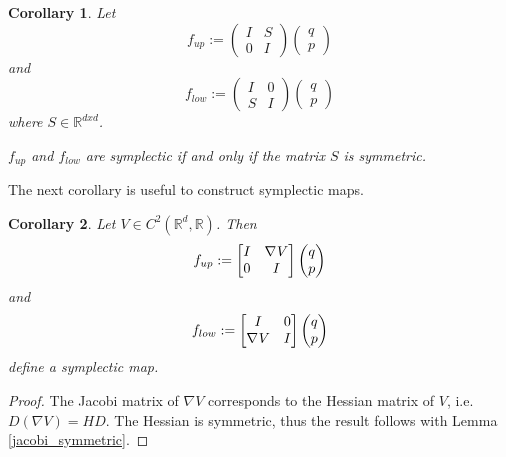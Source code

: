 \documentclass[twoside,a4paper]{article}
\newtheorem{corollary}{Corollary}
\begin{document}
\begin{corollary}\label{matrix_symmetric}
	Let
	\begin{equation*}
		f_{up} := \begin{pmatrix}
			I & S \\
			0 & I
		\end{pmatrix} \begin{pmatrix}
			q \\
			p
		\end{pmatrix}
	\end{equation*}
	and
	\begin{equation*}
		f_{low} := \begin{pmatrix}
			I & 0 \\
			S & I
		\end{pmatrix} \begin{pmatrix}
			q \\
			p
		\end{pmatrix}
	\end{equation*}
	where $S \in \mathbb{R}^{dxd}$. 

	$f_{up}$ and $f_{low}$ are symplectic if and only if the matrix $S$
	is symmetric.
\end{corollary}

The next corollary is useful to construct symplectic maps.
\begin{corollary}\label{gradient_corollary}
	Let $V \in C^2(\mathbb{R}^d, \mathbb{R})$. Then
	\begin{equation*}
		f_{up} := \begin{bmatrix}
			I & \nabla_{}{V} \\
			0 & I
		\end{bmatrix} \begin{pmatrix}
			q \\
			p
		\end{pmatrix}
	\end{equation*}
	and
	\begin{equation*}
		f_{low} := \begin{bmatrix}
			I & 0 \\
			\nabla_{}{V} & I
		\end{bmatrix} \begin{pmatrix}
			q \\
			p
		\end{pmatrix}
	\end{equation*}
	define a symplectic map.
\end{corollary}
\begin{proof}
	The Jacobi matrix of $\nabla V$ corresponds to the Hessian matrix of $V$,
	i.e. $D(\nabla V) = HD$. 
	The Hessian is symmetric, thus the result follows with Lemma \ref{jacobi_symmetric}.
\end{proof}
\end{document}
